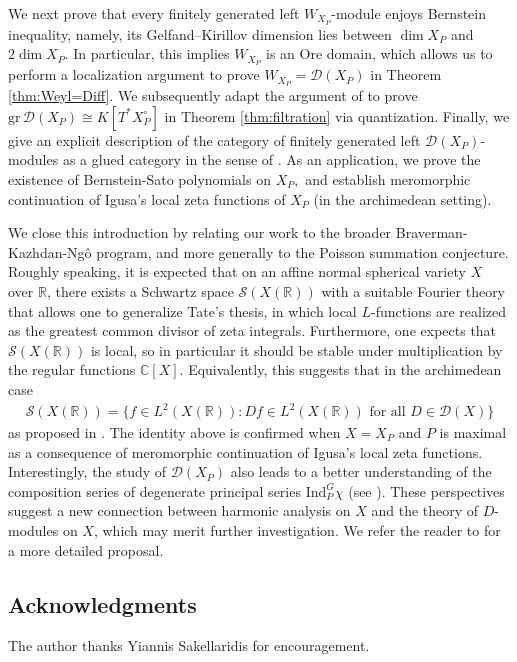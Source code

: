 \documentclass[11pt,a4paper,usenames,dvipsnames,reqno]{amsart}
\numberwithin{equation}{section}
\newcommand{\cc}{\mathbb C}
\newcommand{\rr}{\mathbb R}
\theoremstyle{definition}
\theoremstyle{remark}
\begin{document}
We next prove that every finitely generated left $W_{X_P}$-module enjoys Bernstein inequality, namely, its Gelfand–Kirillov dimension lies between $\dim X_P$ and $2\dim X_P$. In particular, this implies $W_{X_P}$ is an Ore domain, which allows us to perform a localization argument to prove $W_{X_P}=\mathcal{D}(X_P)$ in Theorem \ref{thm:Weyl=Diff}. We subsequently adapt the argument of  \cite{GR:basic} to prove $\mathrm{gr}\,\mathcal{D}(X_P)\cong K[T^\ast X^\circ_P]$ in Theorem \ref{thm:filtration} via quantization. Finally, we give an explicit description of the category of finitely generated left $\mathcal{D}(X_P)$-modules as a glued category in the sense of \cite{BBP:Gluingbasicaffine}. As an application, we prove the existence of Bernstein-Sato polynomials on $X_P,$ and establish meromorphic continuation of Igusa's local zeta functions of $X_P$ (in the archimedean setting). 

We close this introduction by relating our work to the broader Braverman-Kazhdan-Ng\^{o} program, and more generally to the Poisson summation conjecture. Roughly speaking, it is expected that on an affine normal spherical variety $X$ over $\rr$, there exists a Schwartz space $\mathcal{S}(X(\rr))$ with a suitable Fourier theory that allows one to generalize Tate's thesis, in which local $L$-functions are realized as the greatest common divisor of zeta integrals. Furthermore, one expects that $\mathcal{S}(X(\rr))$ is local, so in particular it should be stable under multiplication by the regular functions $\cc[X]$. Equivalently, this suggests that in the archimedean case
\begin{align*}
    \mathcal{S}(X(\rr))=\{ f\in L^2(X(\rr)): Df\in L^2(X(\rr)) \textrm{ for all } D\in \mathcal{D}(X)\}
\end{align*}
as proposed in \cite{BKnormalized}. The identity above is confirmed when $X=X_P$ and $P$ is maximal \cite[Theorem 7.16]{Hsu:asymptotics} as a consequence of meromorphic continuation of Igusa's local zeta functions. Interestingly, the study of $\mathcal{D}(X_P)$ also leads to a better understanding of the composition series of degenerate principal series $\mathrm{Ind}_P^G\chi$ (see \cite[\S 7.3]{Hsu:asymptotics}). These perspectives suggest a new connection between harmonic analysis on $X$ and the theory of $D$-modules on $X$, which may merit further investigation. We refer the reader to \cite{Modulation} for a more detailed proposal. 

\subsection*{Acknowledgments}
The author thanks Yiannis Sakellaridis for encouragement.
\end{document}
